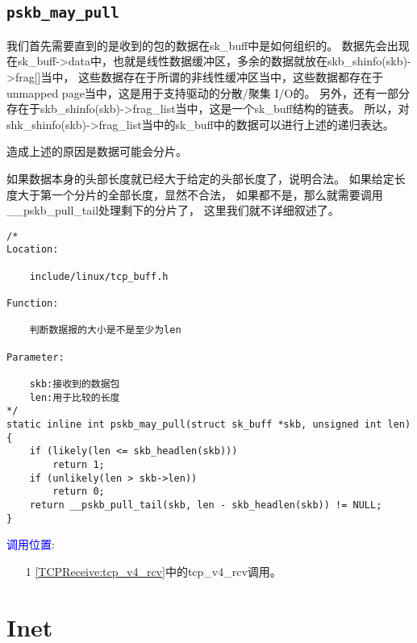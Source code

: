     \subsection{\texttt{pskb_may_pull}}
        \label{BSD:pskb_may_pull}
        我们首先需要直到的是收到的包的数据在sk\_buff中是如何组织的。
        数据先会出现在sk\_buff->data中，也就是线性数据缓冲区，多余的数据就放在skb\_shinfo(skb)->frag[]当中，
        这些数据存在于所谓的非线性缓冲区当中，这些数据都存在于unmapped page当中，这是用于支持驱动的分散/聚集 I/O的。
        另外，还有一部分存在于skb\_shinfo(skb)->frag\_list当中，这是一个sk\_buff结构的链表。
        所以，对shk\_shinfo(skb)->frag\_list当中的sk\_buff中的数据可以进行上述的递归表达。

        造成上述的原因是数据可能会分片。

        如果数据本身的头部长度就已经大于给定的头部长度了，说明合法。
        如果给定长度大于第一个分片的全部长度，显然不合法，
        如果都不是，那么就需要调用\_\_pskb\_pull\_tail处理剩下的分片了，
        这里我们就不详细叙述了。
\begin{verbatim}
/*
Location:

    include/linux/tcp_buff.h

Function:

    判断数据报的大小是不是至少为len

Parameter:

    skb:接收到的数据包
    len:用于比较的长度
*/
static inline int pskb_may_pull(struct sk_buff *skb, unsigned int len)
{
    if (likely(len <= skb_headlen(skb)))
        return 1;
    if (unlikely(len > skb->len))
        return 0;
    return __pskb_pull_tail(skb, len - skb_headlen(skb)) != NULL;
}
\end{verbatim}

        \textcolor{blue}{调用位置}:

        \begin{enumerate}
            \item[1]        \ref{TCPReceive:tcp_v4_rcv}中的tcp\_v4\_rcv调用。
        \end{enumerate}
    
\section{Inet}

